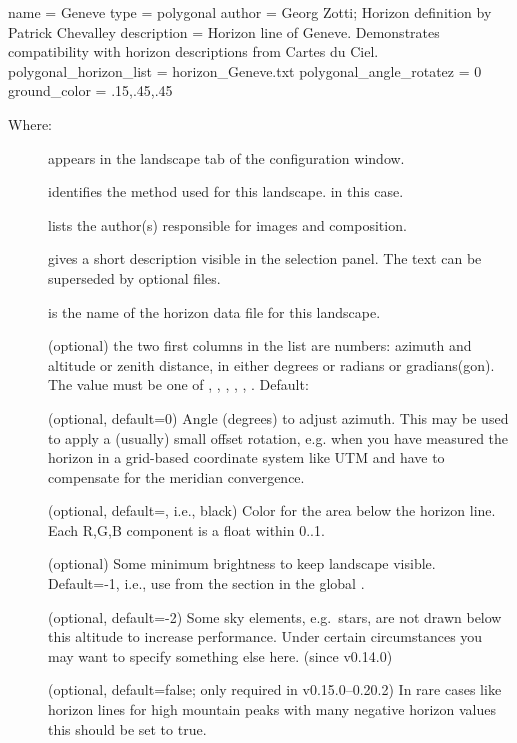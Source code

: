 \begin{configfile}
[landscape]
name = Geneve
type = polygonal
author = Georg Zotti; Horizon definition by Patrick Chevalley
description = Horizon line of Geneve.
              Demonstrates compatibility with
              horizon descriptions from Cartes du Ciel.
polygonal_horizon_list = horizon_Geneve.txt
polygonal_angle_rotatez = 0
ground_color = .15,.45,.45
\end{configfile}
%
Where:
\begin{description}
\item[] appears in the landscape tab of the configuration window.
\item[] identifies the method used for this landscape.  in this case.
\item[] lists the author(s) responsible for images and composition.
\item[] gives a short description visible in the
  selection panel. The text can be superseded by optional
   files.
\item[] is the name of the horizon data file for this landscape.
\item[] (optional) the two first
  columns in the list are numbers: azimuth and altitude or zenith
  distance, in either degrees or radians or gradians(gon). The value
  must be one of , , ,
    , , . Default:
\item[] (optional, default=0) Angle
  (degrees) to adjust azimuth. This may be used to apply a (usually)
  small offset rotation, e.g. when you have measured the horizon in a
  grid-based coordinate system like UTM and have to compensate for the
  meridian convergence.
\item[] (optional, default=, i.e.,
  black) Color for the area below the horizon line. Each R,G,B
  component is a float within 0..1.
\item[] (optional) Some minimum brightness to
  keep landscape visible. Default=-1, i.e., use
   from the \var{[landscape]} section in the
  global .
\item[] (optional, default=-2) Some sky
  elements, e.g.\ stars, are not drawn below this altitude to increase
  performance. Under certain circumstances you may want to specify
  something else here. (since v0.14.0)
\item[] (optional, default=false;
  only required in v0.15.0--0.20.2) In rare cases like horizon lines
  for high mountain peaks with many negative horizon values this
  should be set to true.
\end{description}
